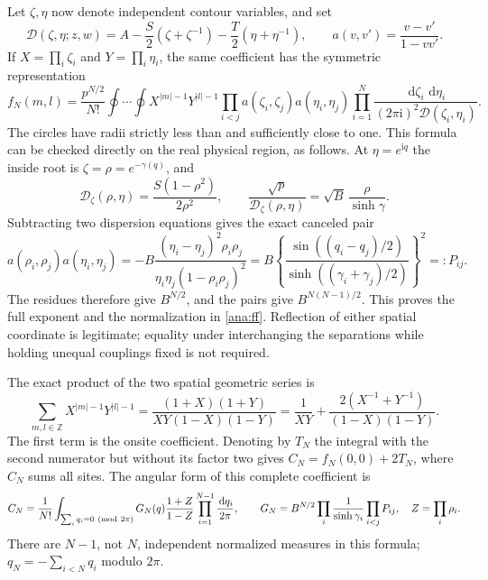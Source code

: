 \documentclass[11pt]{article}
\numberwithin{equation}{section}
\theoremstyle{definition}
\newcommand{\Z}{\mathbb Z}
\newcommand{\ii}{\mathrm i}
\newcommand{\dd}{\,\mathrm d}
\begin{document}
Let \(\zeta,\eta\) now denote independent contour variables, and set
\[
 \mathcal D(\zeta,\eta;z,w)=
 A-\frac S2(\zeta+\zeta^{-1})
  -\frac T2(\eta+\eta^{-1}),\qquad
 a(v,v')=\frac{v-v'}{1-vv'}.
\]
If \(X=\prod_i\zeta_i\) and \(Y=\prod_i\eta_i\), the same coefficient
has the symmetric representation
\begin{equation}\label{ana:doublecorr}
 f_N(m,l)=\frac{p^{N/2}}{N!}\oint\cdots\oint
 X^{|m|-1}Y^{|l|-1}
 \prod_{i<j}a(\zeta_i,\zeta_j)a(\eta_i,\eta_j)
 \prod_{i=1}^N
 \frac{\dd\zeta_i\,\dd\eta_i}{(2\pi\ii)^2\mathcal D(\zeta_i,\eta_i)}.
\end{equation}
The circles have radii strictly less than and sufficiently close to
one. This formula can be checked directly on the real physical
region, as follows. At \(\eta=e^{\ii q}\) the inside root is
\(\zeta=\rho=e^{-\gamma(q)}\), and
\[
 \mathcal D_\zeta(\rho,\eta)
   =\frac{S(1-\rho^2)}{2\rho^2},\qquad
 \frac{\sqrt p}{\mathcal D_\zeta(\rho,\eta)}
   =\sqrt B\,\frac{\rho}{\sinh\gamma}.
\]
Subtracting two dispersion equations gives the exact canceled pair
\begin{equation}\label{ana:pair}
 a(\rho_i,\rho_j)a(\eta_i,\eta_j)
 =-B\frac{(\eta_i-\eta_j)^2\rho_i\rho_j}
          {\eta_i\eta_j(1-\rho_i\rho_j)^2}
 =B\left\{\frac{\sin((q_i-q_j)/2)}
       {\sinh((\gamma_i+\gamma_j)/2)}\right\}^{\!2}
 =:P_{ij}.
\end{equation}
The residues therefore give \(B^{N/2}\), and the pairs give
\(B^{N(N-1)/2}\). This proves the full exponent and the normalization
in \eqref{ana:ff}. Reflection of either spatial coordinate is
legitimate; equality under interchanging the separations while holding
unequal couplings fixed is not required.

The exact product of the two spatial geometric series is
\begin{equation}\label{ana:fullsites}
 \sum_{m,l\in\Z}X^{|m|-1}Y^{|l|-1}
 =\frac{(1+X)(1+Y)}{XY(1-X)(1-Y)}
 =\frac1{XY}+\frac{2(X^{-1}+Y^{-1})}{(1-X)(1-Y)}.
\end{equation}
The first term is the onsite coefficient. Denoting by \(T_N\)
the integral with the second numerator but without its factor two
gives \(C_N=f_N(0,0)+2T_N\), where \(C_N\) sums all sites.
The angular form of this complete coefficient is
\begin{equation}\label{ana:angular}
 C_N=\frac1{N!}
 \int_{\sum_iq_i=0\ ({\rm mod}\ 2\pi)}
 G_N(q)\frac{1+Z}{1-Z}
 \prod_{i=1}^{N-1}\frac{\dd q_i}{2\pi},\qquad
 G_N=B^{N/2}\prod_i\frac1{\sinh\gamma_i}\prod_{i<j}P_{ij},
 \quad Z=\prod_i\rho_i.
\end{equation}
There are \(N-1\), not \(N\), independent normalized measures in this
formula; \(q_N=-\sum_{i<N}q_i\) modulo \(2\pi\).
\end{document}
